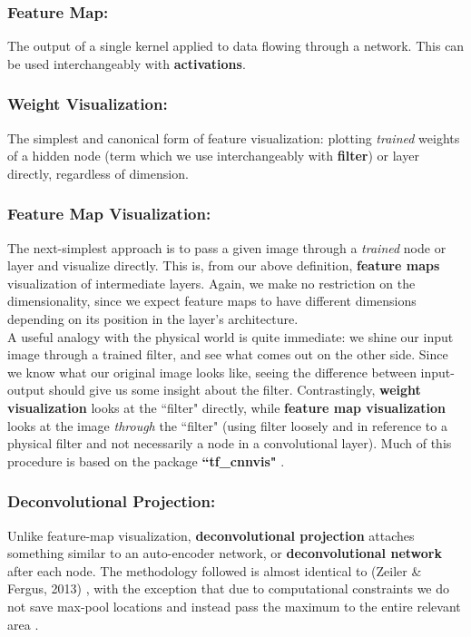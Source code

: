 \documentclass[12pt]{article}
\begin{document}
\subsubsection{Feature Map:}
The output of a single kernel applied to data flowing through a network. This can be used interchangeably with \textbf{activations}.

\subsubsection{Weight Visualization:}
The simplest and canonical form of feature visualization: plotting \textit{trained} weights of a hidden node (term which we use interchangeably with \textbf{filter}) or layer directly, regardless of dimension.

\subsubsection{Feature Map Visualization:}
The next-simplest approach is to pass a given image through a \textit{trained} node or layer and visualize directly. This is, from our above definition, \textbf{feature maps} visualization of intermediate layers. Again, we make no restriction on the dimensionality, since we expect feature maps to have different dimensions depending on its position in the layer's architecture.\\

A useful analogy with the physical world is quite immediate: we shine our input image through a trained filter, and see what comes out on the other side. Since we know what our original image looks like, seeing the difference between input-output should give us some insight about the filter. Contrastingly, \textbf{weight visualization} looks at the ``filter" directly, while \textbf{feature map visualization} looks at the image \textit{through} the ``filter" (using filter loosely and in reference to a physical filter and not necessarily a node in a convolutional layer). Much of this procedure is based on the package \textbf{``tf\_cnnvis"} \cite{cnnvis}.

\subsubsection{Deconvolutional Projection:}
Unlike feature-map  visualization, \textbf{deconvolutional projection} attaches something similar to an auto-encoder network, or \textbf{deconvolutional network} after each node. The methodology followed is almost identical to (Zeiler \& Fergus, 2013) \cite{zeiler}, with the exception that due to computational constraints we do not save max-pool locations and instead pass the maximum to the entire relevant area \cite{oxford, kvfrans}. \\
\end{document}
